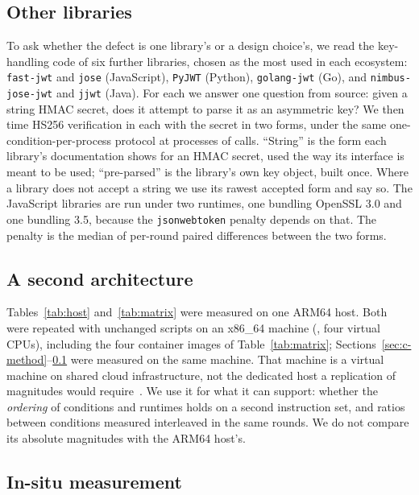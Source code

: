 \documentclass[preprint,12pt,authoryear]{elsarticle}
\newcommand{\LibraryName}{\texttt{jsonwebtoken}}
\begin{document}
\subsection{Other libraries}\label{sec:xlib-method}

To ask whether the defect is one library's or a design choice's, we read the
key-handling code of six further libraries, chosen as the most used in each
ecosystem: \texttt{fast-jwt} and \texttt{jose} (JavaScript), \texttt{PyJWT}
(Python), \texttt{golang-jwt} (Go), and \texttt{nimbus-jose-jwt} and
\texttt{jjwt} (Java). For each we answer one question from source: given a
string HMAC secret, does it attempt to parse it as an asymmetric key? We then
time HS256 verification in each with the secret in two forms, under the same
one-condition-per-process protocol at \XlibInvocations{} processes of
\XlibCallsPerInvocation{} calls. ``String'' is the form each library's
documentation shows for an HMAC secret, used the way its interface is meant to
be used; ``pre-parsed'' is the library's own key object, built once. Where a
library does not accept a string we use its rawest accepted form and say so.
The JavaScript libraries are run under two runtimes, one bundling OpenSSL 3.0
and one bundling 3.5, because the \LibraryName{} penalty depends on that. The
penalty is the median of per-round paired differences between the two forms.

\subsection{A second architecture}\label{sec:arch-method}

Tables~\ref{tab:host} and~\ref{tab:matrix} were measured on one ARM64 host.
Both were repeated with unchanged scripts on an x86\_64 machine (\ExcCpuModel,
four virtual CPUs), including the four container images of
Table~\ref{tab:matrix}; Sections~\ref{sec:c-method}--\ref{sec:xlib-method}
were measured on the same machine. That machine is a virtual machine on shared
cloud infrastructure, not the dedicated host a replication of magnitudes would
require~\citep{laaber2019cloud,leitner2016patterns}. We use it for what it can
support: whether the \emph{ordering} of conditions and runtimes holds on a
second instruction set, and ratios between conditions measured interleaved in
the same rounds. We do not compare its absolute magnitudes with the ARM64
host's.

\subsection{In-situ measurement}\label{sec:insitu-method}
\end{document}
